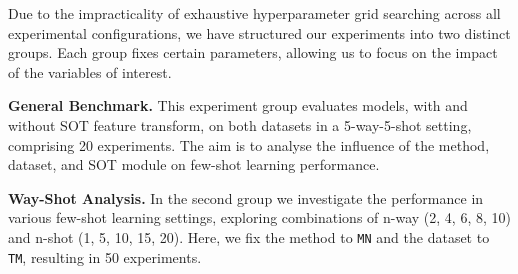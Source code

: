 Due to the impracticality of exhaustive hyperparameter grid searching across all experimental configurations, 
we have structured our experiments into two distinct groups. Each group fixes certain parameters, allowing us to focus on the impact of the variables of interest.

\textbf{General Benchmark.} This experiment group evaluates models, with and without SOT feature transform, on both datasets in a 5-way-5-shot setting, 
comprising 20 experiments. The aim is to analyse the influence of the method, dataset, and SOT module on few-shot learning performance.

\textbf{Way-Shot Analysis.} In the second group we investigate the performance in various few-shot learning settings, exploring combinations of n-way ({2, 4, 6, 8, 10}) and n-shot ({1, 5, 10, 15, 20}). Here, we fix the method to \texttt{MN} and the dataset to \texttt{TM}, resulting in 50 experiments.